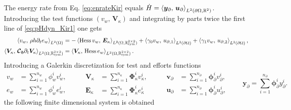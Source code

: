 The energy rate from Eq. \eqref{eq:enrateKir} equals $\dot{H} = \inner[L^2(\partial\Omega, \mathbb{R}^2)]{\bm{y}_\partial}{\bm{u}_\partial}$. Introducing the test functions $(v_w,\, \bm{V}_\kappa)$ and integrating by parts twice the first line of \eqref{eq:pHdyn_Kir1} one gets 
\begin{equation}\label{eq:weak_kir_Hess}
\begin{aligned}
\inner[L^2(\Omega)]{v_w}{\rho h \partial_t e_w} &= -\inner[L^2(\Omega, \mathbb{R}^{2\times 2}_{\text{sym}})]{\Hess v_w}{\bm{E}_\kappa} + \inner[L^2(\partial\Omega)]{\gamma_0 v_w}{{u}_{\partial, 1}} + \inner[L^2(\partial\Omega)]{\gamma_1 v_w}{{u}_{\partial, 2}}, \\
\inner[L^2(\Omega, \mathbb{R}^{2\times 2}_{\text{sym}})]{\bm{V}_\kappa}{\bm{\mathcal{C}_b} \partial_t \bm{V}_\kappa} &= \inner[L^2(\Omega, \mathbb{R}^{2\times 2}_{\text{sym}})]{\bm{V}_\kappa}{\Hess e_w}. \\
\end{aligned}
\end{equation}
Introducing a Galerkin discretization for test and efforts functions
\begin{equation}
\begin{aligned}
v_w &= \sum_{i = 1}^{n_w} \phi_w^i v_w^i, \\
e_w &= \sum_{i = 1}^{n_w} \phi_w^i e_w^i,
\end{aligned} \qquad
\begin{aligned}
\bm{V}_\kappa &= \sum_{i = 1}^{n_\kappa} \bm\Phi_\kappa^i v_\kappa^i, \\
\bm{E}_\kappa &= \sum_{i = 1}^{n_\kappa} \bm\Phi_\kappa^i e_\kappa^i
\end{aligned} \qquad
\begin{aligned}
\bm{v}_\partial &= \sum_{i = 1}^{n_\partial} \bm\phi_\partial^i v_\partial^i, \\
\bm{u}_\partial  &= \sum_{i = 1}^{n_\partial} \bm\phi_\partial^i u_\partial^i,
\end{aligned} \qquad
\bm{y}_\partial = \sum_{i = 1}^{n_\partial} \bm\phi_\partial^i y_\partial^i.
\end{equation} 
the following finite dimensional system is obtained
